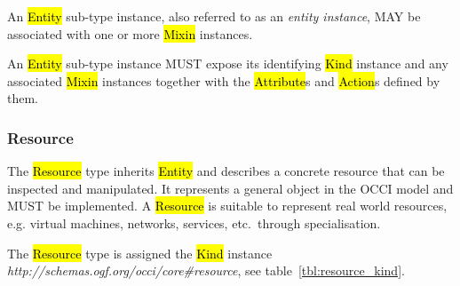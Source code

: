 \documentclass[10pt,a4paper]{article}
\begin{document}
An \hl{Entity} sub-type instance, also referred to as an {\em entity instance},
MAY be associated with one or more \hl{Mixin} instances.

An \hl{Entity} sub-type instance MUST expose its identifying \hl{Kind}
instance and any associated \hl{Mixin} instances together with the
\hl{Attribute}s and \hl{Action}s defined by them.

\subsubsection{Resource}
\label{sec:resource}
The \hl{Resource} type inherits \hl{Entity} and describes a concrete
resource that can be inspected and manipulated. It represents a
general object in the OCCI model and MUST be implemented. A
\hl{Resource} is suitable to represent real world resources,
e.g. virtual machines, networks, services, etc.~through
specialisation.


The \hl{Resource} type is assigned the \hl{Kind} instance
\textit{http://schemas.ogf.org/occi/core\#resource}, see
table~\ref{tbl:resource_kind}.
%
\end{document}
